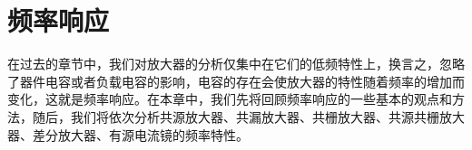 \chapter{频率响应}

在过去的章节中，我们对放大器的分析仅集中在它们的低频特性上，换言之，忽略了器件电容或者负载电容的影响，电容的存在会使放大器的特性随着频率的增加而变化，这就是频率响应。在本章中，我们先将回顾频率响应的一些基本的观点和方法，随后，我们将依次分析共源放大器、共漏放大器、共栅放大器、共源共栅放大器、差分放大器、有源电流镜的频率特性。





